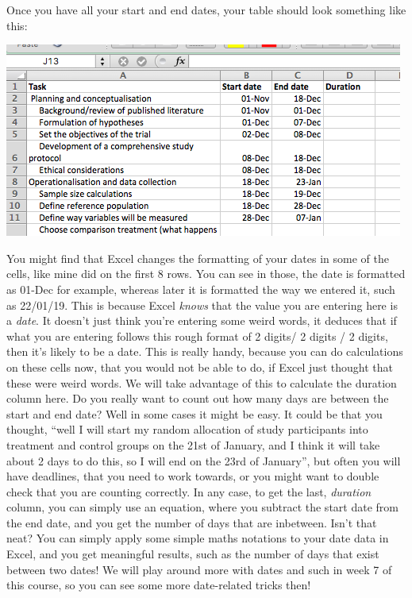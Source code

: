 \documentclass[
]{book}
\begin{document}
Once you have all your start and end dates, your table should look something like this:

\includegraphics{imgs/gantt_start_end.png}

You might find that Excel changes the formatting of your dates in some of the cells, like mine did on the first 8 rows. You can see in those, the date is formatted as 01-Dec for example, whereas later it is formatted the way we entered it, such as 22/01/19. This is because Excel \emph{knows} that the value you are entering here is a \emph{date}. It doesn't just think you're entering some weird words, it deduces that if what you are entering follows this rough format of 2 digits/ 2 digits / 2 digits, then it's likely to be a date. This is really handy, because you can do calculations on these cells now, that you would not be able to do, if Excel just thought that these were weird words. We will take advantage of this to calculate the duration column here. Do you really want to count out how many days are between the start and end date? Well in some cases it might be easy. It could be that you thought, ``well I will start my random allocation of study participants into treatment and control groups on the 21st of January, and I think it will take about 2 days to do this, so I will end on the 23rd of January'', but often you will have deadlines, that you need to work towards, or you might want to double check that you are counting correctly. In any case, to get the last, \emph{duration} column, you can simply use an equation, where you subtract the start date from the end date, and you get the number of days that are inbetween. Isn't that neat? You can simply apply some simple maths notations to your date data in Excel, and you get meaningful results, such as the number of days that exist between two dates! We will play around more with dates and such in week 7 of this course, so you can see some more date-related tricks then!
\end{document}
